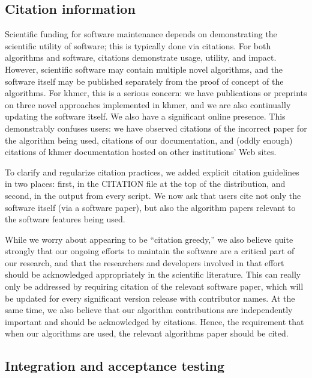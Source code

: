 \documentclass[12pt]{article}
\begin{document}


\subsection{Citation information}

Scientific funding for software maintenance depends on demonstrating
the scientific utility of software; this is typically done via
citations.  For both algorithms and software, citations demonstrate
usage, utility, and impact.  However, scientific software may contain
multiple novel algorithms, and the software itself may be published
separately from the proof of concept of the algorithms.  For khmer,
this is a serious concern: we have publications or preprints on three
novel approaches implemented in khmer, and we are also continually
updating the software itself.  We also have a significant online
presence. This demonstrably confuses users: we have observed citations
of the incorrect paper for the algorithm being used, citations of our
documentation, and (oddly enough) citations of khmer documentation
hosted on other institutions' Web sites.

To clarify and regularize citation practices, we added explicit
citation guidelines in two places: first, in the CITATION file at the
top of the distribution, and second, in the output from every script.
We now ask that users cite not only the software itself (via a
software paper), but also the algorithm papers relevant to the
software features being used.

While we worry about appearing to be ``citation greedy,'' we also
believe quite strongly that our ongoing efforts to maintain the
software are a critical part of our research, and that the researchers
and developers involved in that effort should be acknowledged
appropriately in the scientific literature.  This can really only be
addressed by requiring citation of the relevant software paper, which
will be updated for every significant version release with contributor
names.  At the same time, we also believe that our algorithm
contributions are independently important and should be acknowledged
by citations.  Hence, the requirement that when our algorithms are
used, the relevant algorithms paper should be cited.

\subsection{Integration and acceptance testing}
\end{document}
